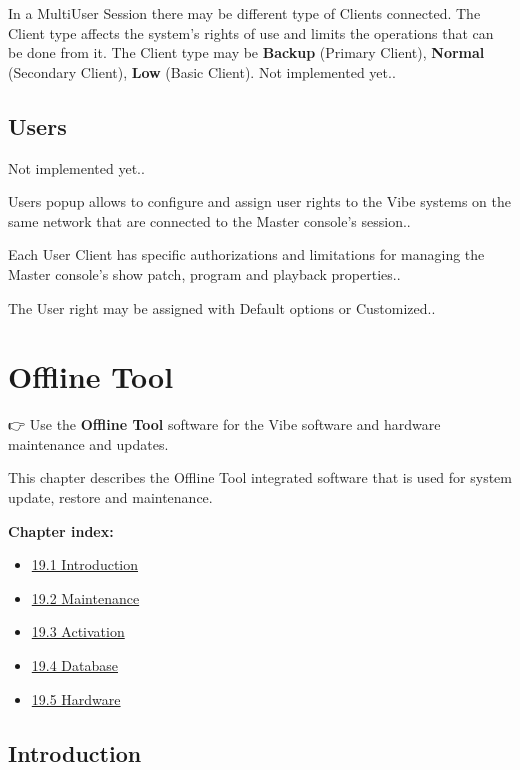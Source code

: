 \documentclass[
]{article}
\providecommand{\tightlist}{%
  \setlength{\itemsep}{0pt}\setlength{\parskip}{0pt}}
\begin{document}
{ In a MultiUser Session there may be different type of Clients connected. The Client type affects the system's rights of use and limits the operations that can be done from it. The Client type may be \textbf{Backup} (Primary Client), \textbf{Normal} (Secondary Client), \textbf{Low} (Basic Client). Not implemented yet.}.

\hypertarget{users-1}{%
\subsection{Users}\label{users-1}}

{Not implemented yet.}.

{ Users popup allows to configure and assign user rights to the Vibe systems on the same network that are connected to the Master console's session.}.

{ Each User Client has specific authorizations and limitations for managing the Master console's show patch, program and playback properties.}.

{ The User right may be assigned with Default options or Customized.}.

\hypertarget{offline-tool}{%
\section{Offline Tool}\label{offline-tool}}

👉 Use the \textbf{Offline Tool} software for the Vibe software and hardware maintenance and updates.

This chapter describes the Offline Tool integrated software that is used for system update, restore and maintenance.

\textbf{Chapter index:}

\begin{itemize}
\tightlist
\item
  \protect\hyperlink{Introduction-19.1}{19.1 Introduction}
\item
  \protect\hyperlink{Maintenance-19.2}{19.2 Maintenance}
\item
  \protect\hyperlink{Activation-19.3}{19.3 Activation}
\item
  \protect\hyperlink{Database-19.4}{19.4 Database}
\item
  \protect\hyperlink{Hardware-19.5}{19.5 Hardware}
\end{itemize}

\hypertarget{introduction-1}{%
\subsection{Introduction}\label{introduction-1}}
\end{document}
